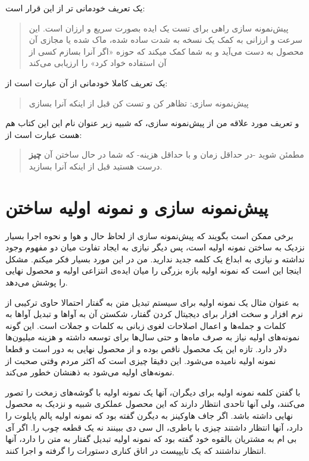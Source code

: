 یک تعریف خودمانی تر از این قرار است:

\begin{quote}
پیش‌نمونه سازی راهی برای تست یک ایده بصورت سریع و ارزان است. این سرعت و
ارزانی به کمک یک نسخه به شدت ساده شده، ماک شده یا مجازی آن محصول به دست
می‌آید و به شما کمک میکند که حوزه «اگر آنرا بسازم کسی از آن استفاده خواد
کرد» را ارزیابی می‌کند
\end{quote}

یک تعریف کاملا خودمانی از آن عبارت است از:

\begin{quote}
پیش‌نمونه سازی: تظاهر کن و تست کن قبل از اینکه آنرا بسازی
\end{quote}

و تعریف مورد علاقه من از پیش‌نمونه سازی، که شبیه زیر عنوان نام این این
کتاب هم هست عبارت است از:

\begin{quote}
مطمئن شوید -در حداقل زمان و با حداقل هزینه- که شما در حال ساختن آن
\textbf{چیز} درست هستید قبل از اینکه آنرا بسازید.
\end{quote}

\section{پیش‌نمونه سازی و نمونه اولیه
ساختن}\label{ux67eux6ccux634ux646ux645ux648ux646ux647-ux633ux627ux632ux6cc-ux648-ux646ux645ux648ux646ux647-ux627ux648ux644ux6ccux647-ux633ux627ux62eux62aux646}

برخی ممکن است بگویند که پیش‌نمونه سازی از لحاظ حال و هوا و نحوه اجرا
بسیار نزدیک به ساختن نمونه اولیه است، پس دیگر نیازی به ایجاد تفاوت میان
دو مفهوم وجود نداشته و نیازی به ابداع یک کلمه جدید ندارید. من در این
مورد بسیار فکر میکنم. مشکل اینجا این است که نمونه اولیه بازه بزرگی را
میان ایده‌ی انتزاعی اولیه و محصول نهایی را پوشش می‌دهد.

به عنوان مثال یک نمونه اولیه برای سیستم تبدیل متن به گفتار احتمالا حاوی
ترکیبی از نرم افزار و سخت افزار برای دیجیتال کردن گفتار، شکستن آن به
آواها و تبدیل آواها به کلمات و جمله‌ها و اعمال اصلاحات لغوی زبانی به
کلمات و جملات است. این گونه نمونه‌های اولیه نیاز به صرف ماه‌ها و حتی
سال‌ها برای توسعه داشته و هزینه میلیون‌ها دلار دارد. تازه این یک محصول
ناقص بوده و از محصول نهایی به دور است و قطعا نمونه اولیه نامیده می‌شود.
این دقیقا چیزی است که اکثر مردم وقتی صحبت از نمونه‌های اولیه می‌شود به
ذهنشان خطور می‌کند.

با گفتن کلمه نمونه اولیه برای دیگران، آنها یک نمونه اولیه با گوشه‌های
زمخت را تصور می‌کنند، ولی آنها تاحدی انتظار دارند که این محصول عملکری
شبیه و نزدیک به محصول نهایی داشته باشد. اگر جاف هاوکینز به دیگرن گفته
بود که نمونه اولیه پالم پایلوت را دارد، آنها انتظار داشتند چیزی با
باطری، ال سی دی ببینند نه یک قطعه چوب را. اگر آی بی ام به مشتریان بالقوه
خود گفته بود که نمونه اولیه تبدیل گفتار به متن را دارد، آنها انتظار
نداشتند که یک تایپیست در اتاق کناری دستورات را گرفته و اجرا کنند.

